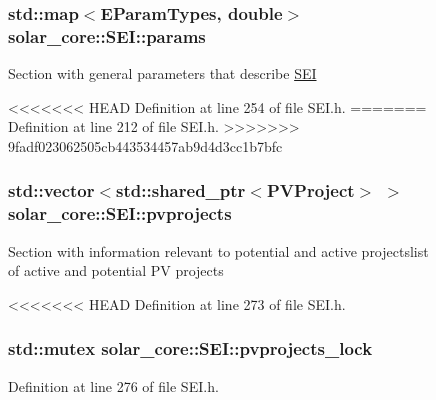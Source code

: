 \begin{figure}[H]
\begin{center}
\subsubsection[{params}]{\setlength{\rightskip}{0pt plus 5cm}std\+::map$<${\bf E\+Param\+Types}, double$>$ solar\+\_\+core\+::\+S\+E\+I\+::params\hspace{0.3cm}{\ttfamily [protected]}}\label{classsolar__core_1_1_s_e_i_a811b998092171224983f9aefaa974707}
Section with general parameters that describe \hyperlink{classsolar__core_1_1_s_e_i}{S\+E\+I} 

<<<<<<< HEAD
Definition at line 254 of file S\+E\+I.\+h.
=======
Definition at line 212 of file S\+E\+I.\+h.
>>>>>>> 9fadf023062505cb443534457ab9d4d3cc1b7bfc

\hypertarget{classsolar__core_1_1_s_e_i_a76d9d151e51465d534ff0fd3d64f98bc}{}
\subsubsection[{pvprojects}]{\setlength{\rightskip}{0pt plus 5cm}std\+::vector$<$std\+::shared\+\_\+ptr$<${\bf P\+V\+Project}$>$ $>$ solar\+\_\+core\+::\+S\+E\+I\+::pvprojects\hspace{0.3cm}{\ttfamily [protected]}}\label{classsolar__core_1_1_s_e_i_a76d9d151e51465d534ff0fd3d64f98bc}
Section with information relevant to potential and active projectslist of active and potential P\+V projects 

<<<<<<< HEAD
Definition at line 273 of file S\+E\+I.\+h.

\hypertarget{classsolar__core_1_1_s_e_i_adc031a01a6acf03d68b6d0037a2c8a30}{}
\subsubsection[{pvprojects\+\_\+lock}]{\setlength{\rightskip}{0pt plus 5cm}std\+::mutex solar\+\_\+core\+::\+S\+E\+I\+::pvprojects\+\_\+lock\hspace{0.3cm}{\ttfamily [protected]}}\label{classsolar__core_1_1_s_e_i_adc031a01a6acf03d68b6d0037a2c8a30}


Definition at line 276 of file S\+E\+I.\+h.


\end{center}
\end{figure}
